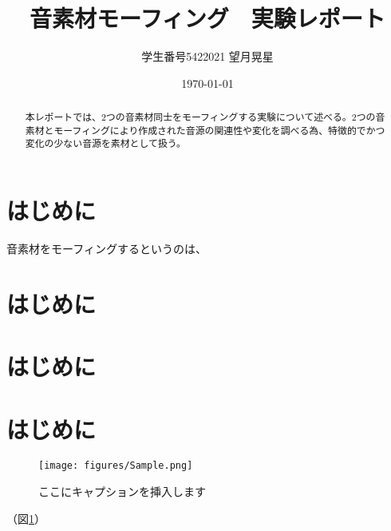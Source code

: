 \documentclass[platex,dvipdfmx]{jlreq}			%
\title{音素材モーフィング　実験レポート}
\author{学生番号5422021 望月晃星}
\date{\today}
\begin{document}
\maketitle

\begin{abstract}%
本レポートでは、2つの音素材同士をモーフィングする実験について述べる。2つの音素材とモーフィングにより作成された音源の関連性や変化を調べる為、特徴的でかつ変化の少ない音源を素材として扱う。
\end{abstract}

\section{はじめに}
音素材をモーフィングするというのは、

\section{はじめに}
\section{はじめに}
\section{はじめに}

\begin{figure}
\centering
\texttt{[image: figures/Sample.png]}
\caption{ここにキャプションを挿入します}
\label{fig:model}
\end{figure}

（図\ref{fig:model}）
\end{document}
